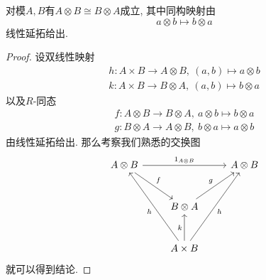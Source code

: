 \begin{prop}[交换律]
    对模$A,B$有$A\otimes B\cong B\otimes A$成立, 其中同构映射由
    \[a\otimes b\mapsto b\otimes a\]
    线性延拓给出.
\end{prop}
\begin{proof}
    设双线性映射
    \begin{gather*}
        h:A\times B\to A\otimes B,\ (a,b)\mapsto a\otimes b\\
        k:A\times B\to B\otimes A,\ (a,b)\mapsto b\otimes a
    \end{gather*}
    以及$R$-同态
    \begin{gather*}
        f:A\otimes B\to B\otimes A,\ a\otimes b\mapsto b\otimes a\\
        g:B\otimes A\to A\otimes B,\ b\otimes a\mapsto a\otimes b
    \end{gather*}
    由线性延拓给出.
    那么考察我们熟悉的交换图
    \[\begin{tikzcd}[row sep=large]
        A\otimes B\arrow[rr, "1_{A\otimes B}"] \arrow[dr, "f"] & & A\otimes B\\
        & B\otimes A \arrow[ur, "g"] &\\
        & A\times B \arrow[uul, "h"] \arrow[u, "k"] \arrow[uur, "h"']
    \end{tikzcd}\]
    就可以得到结论.
\end{proof}

